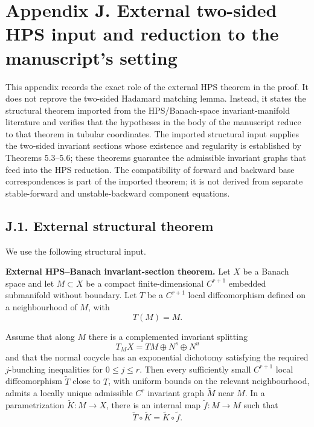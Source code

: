 \documentclass[12pt,a4paper]{article}
\theoremstyle{plain}
\numberwithin{equation}{section}
\numberwithin{theorem}{section}
\begin{document}
\clearpage

\section{Appendix J. External two-sided HPS input and reduction to the manuscript's setting}

This appendix records the exact role of the external HPS theorem in the proof. It does not reprove the two-sided Hadamard matching lemma. Instead, it states the structural theorem imported from the HPS/Banach-space invariant-manifold literature and verifies that the hypotheses in the body of the manuscript reduce to that theorem in tubular coordinates. The imported structural input supplies the two-sided invariant sections whose existence and regularity is established by Theorems 5.3--5.6; these theorems guarantee the admissible invariant graphs that feed into the HPS reduction. The compatibility of forward and backward base correspondences is part of the imported theorem; it is not derived from separate stable-forward and unstable-backward component equations.

\subsection{J.1. External structural theorem}

We use the following structural input.

\textbf{External HPS--Banach invariant-section theorem.} Let $X$ be a Banach space and let $M\subset X$ be a compact finite-dimensional $C^{r+1}$ embedded submanifold without boundary. Let $T$ be a $C^{r+1}$ local diffeomorphism defined on a neighbourhood of $M$, with
\[
T(M)=M.
\]

Assume that along $M$ there is a complemented invariant splitting
\[
T_MX=TM\oplus N^s\oplus N^u
\]
and that the normal cocycle has an exponential dichotomy satisfying the required $j$-bunching inequalities for $0\le j\le r$. Then every sufficiently small $C^{r+1}$ local diffeomorphism $\widetilde T$ close to $T$, with uniform bounds on the relevant neighbourhood, admits a locally unique admissible $C^r$ invariant graph $\widetilde M$ near $M$. In a parametrization $\widetilde K:M\to X$, there is an internal map $\widetilde f:M\to M$ such that
\[
\widetilde T\circ \widetilde K
=
\widetilde K\circ \widetilde f.
\]
\end{document}
